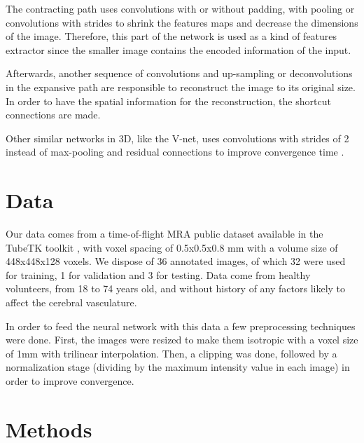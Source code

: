 \documentclass{article}
\begin{document}
The contracting path uses convolutions with or without padding, with pooling or convolutions with strides to shrink the features maps and decrease the dimensions of the image. Therefore, this part of the network is used as a kind of features extractor since the smaller image contains the encoded information of the input. 

Afterwards, another sequence of convolutions and up-sampling or deconvolutions in the expansive path are responsible to reconstruct the image to its original size. In order to have the spatial information for the reconstruction, the shortcut connections are made. 

Other similar networks in 3D, like the V-net, uses convolutions with strides of 2 instead of max-pooling and residual connections to improve convergence time \cite{Milletari2016}.




\section{Data}

Our data comes from a time-of-flight MRA public dataset available in the TubeTK toolkit \cite{Bullit}, with voxel spacing of 0.5x0.5x0.8 mm with a volume size of 448x448x128 voxels. We dispose of 36 annotated images, of which 32 were used for training, 1 for validation and 3 for testing. Data come from healthy volunteers, from 18 to 74 years old, and without history of any factors likely to affect the cerebral vasculature.

In order to feed the neural network with this data a few preprocessing techniques were done. First, the images were resized to make them isotropic with a voxel size of 1mm with trilinear interpolation. Then, a clipping was done, followed by a normalization stage (dividing by the maximum intensity value in each image) in order to improve convergence. 

\section{Methods}
		
\end{document}
